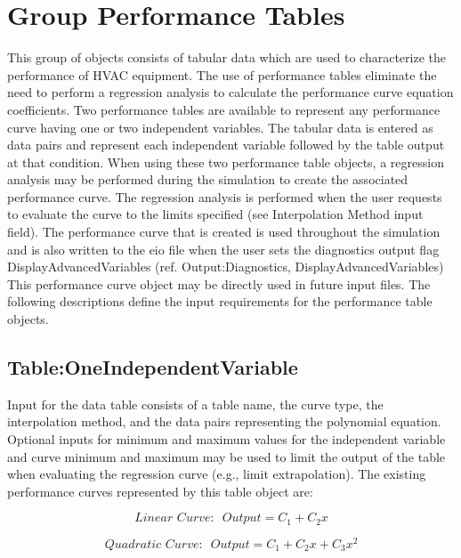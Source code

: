 \section{Group Performance Tables}\label{group-performance-tables}

This group of objects consists of tabular data which are used to characterize the performance of HVAC equipment. The use of performance tables eliminate the need to perform a regression analysis to calculate the performance curve equation coefficients. Two performance tables are available to represent any performance curve having one or two independent variables. The tabular data is entered as data pairs and represent each independent variable followed by the table output at that condition. When using these two performance table objects, a regression analysis may be performed during the simulation to create the associated performance curve. The regression analysis is performed when the user requests to evaluate the curve to the limits specified (see Interpolation Method input field). The performance curve that is created is used throughout the simulation and is also written to the eio file when the user sets the diagnostics output flag DisplayAdvancedVariables (ref. Output:Diagnostics, DisplayAdvancedVariables) This performance curve object may be directly used in future input files. The following descriptions define the input requirements for the performance table objects.

\subsection{Table:OneIndependentVariable}\label{tableoneindependentvariable}

Input for the data table consists of a table name, the curve type, the interpolation method, and the data pairs representing the polynomial equation. Optional inputs for minimum and maximum values for the independent variable and curve minimum and maximum may be used to limit the output of the table when evaluating the regression curve (e.g., limit extrapolation). The existing performance curves represented by this table object are:

\begin{equation}
Linear\,\,Curve:\,\,\,Output = {C_1} + {C_2}x
\end{equation}

\begin{equation}
Quadratic\,\,Curve:\,\,\,Output = {C_1} + {C_2}x + {C_3}{x^2}
\end{equation}

